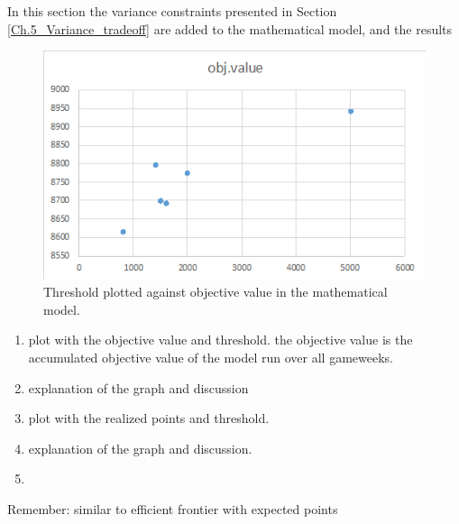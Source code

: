 In this section the variance constraints presented in Section \ref{Ch.5_Variance_tradeoff} are added to the mathematical model, and the results 

\begin{figure}[H]
    \centering
    \includegraphics[scale=0.75]{fig/chapter_7/threshold_obj_value.png}
    \caption{Threshold plotted against objective value in the mathematical model.}
\label{fig: threshold_obj_value}    
\end{figure}

\begin{enumerate}
    \item plot with the objective value and threshold. the objective value is the accumulated objective value of the model run over all gameweeks. 
    \item explanation of the graph and discussion 
    \item plot with the realized points and threshold. 
    \item explanation of the graph and discussion. 
    \item 
\end{enumerate}
Remember: similar to efficient frontier with expected points